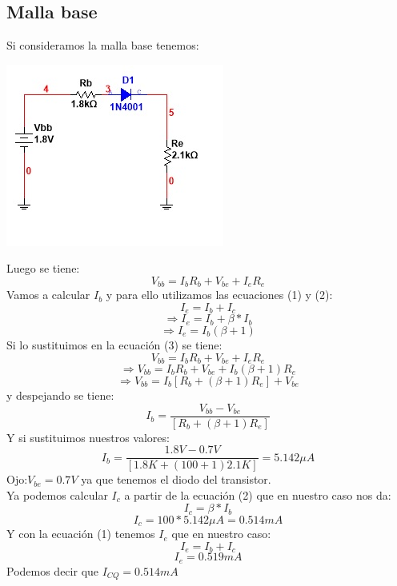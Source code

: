 \documentclass[10pt,a4paper]{article}
\begin{document}
\subsection{Malla base}
Si consideramos la malla base tenemos:
\begin{center}
\includegraphics[scale=1]{Images/Imagen6.jpg}
\end{center}
Luego se tiene:
\begin{equation}
V_{bb}=I_{b}R_{b}+V_{be}+I_{e}R_{e}
\end{equation}
Vamos a calcular $I_{b}$ y para ello utilizamos las ecuaciones (1) y (2):
\[I_{e}=I_{b}+I_{c}\]
\[\Rightarrow I_{e}=I_{b}+\beta*I_{b}\]
\[\Rightarrow I_{e}=I_{b}(\beta+1)\]
Si lo sustituimos en la ecuación (3) se tiene:
\[V_{bb}=I_{b}R_{b}+V_{be}+I_{e}R_{e}\]
\[\Rightarrow V_{bb}=I_{b}R_{b}+V_{be}+I_{b}(\beta+1)R_{e}\]
\[\Rightarrow V_{bb}=I_{b}[R_{b}+(\beta+1)R_{e}]+V_{be}\]
y despejando se tiene:
\[I_{b}=\frac{V_{bb}-V_{be}}{[R_{b}+(\beta+1)R_{e}]}\]
Y si sustituimos nuestros valores:
\[I_{b}=\frac{1.8V-0.7V}{[1.8K+(100+1)2.1K]}=5.142 \mu A\]
Ojo:$V_{be}=0.7V$ ya que tenemos el diodo del transistor.
\\ 
Ya podemos calcular $I_{c}$ a partir de la ecuación (2) que en nuestro caso nos da:
\[I_{c}=\beta*I_{b}\]
\[I_{c}=100*5.142 \mu A= 0.514 mA\]
Y  con la ecuación (1) tenemos $I_{e}$ que en nuestro caso:
\[I_{e}=I_{b}+I_{c}\]
\[I_{e}=0.519 mA\]
Podemos decir que $I_{CQ}=0.514 mA$
\end{document}
